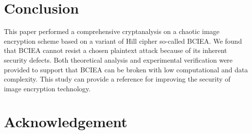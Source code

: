 \documentclass[final,3p,times]{elsarticle}
\begin{document}
%


\section{Conclusion}


This paper performed a comprehensive cryptanalysis on a chaotic image encryption scheme based on a variant of Hill cipher so-called BCIEA. We found that BCIEA cannot resist a chosen plaintext attack because of its inherent security defects. Both theoretical analysis and experimental verification were provided to support that BCIEA can be broken with low computational and data complexity. This study can provide a reference for improving the security of image encryption technology.


\section*{Acknowledgement}




\end{document}
